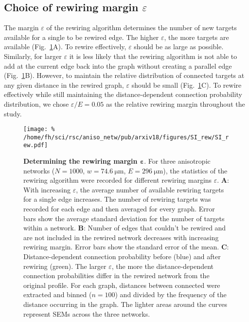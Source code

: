 
\subsection{Choice of rewiring margin $\varepsilon$}

The margin $\varepsilon$ of the rewiring algorithm determines the
number of new targets available for a single to be rewired edge. The
higher $\varepsilon$, the more targets are available
(Fig.~\ref{fig:rew-ddcp-ef}A). To rewire effectively, $\varepsilon$
should be as large as possible. Similarly, for larger $\varepsilon$ it
is less likely that the rewiring algorithm is not able to add at
the current edge back into the graph without creating a parallel edge
(Fig.~\ref{fig:rew-ddcp-ef}B). However, to maintain the relative
distribution of connected targets at any given distance in the rewired
graph, $\varepsilon$ should be small (Fig.~\ref{fig:rew-ddcp-ef}C). To
rewire effectively while still maintaining the distance-dependent
connection probability distribution, we chose $\varepsilon/E = 0.05$
as the relative rewiring margin throughout the study. 

\addtocounter{subsection}{1}
\begin{figure}[h!]
  \texttt{[image: \%
    /home/fh/sci/rsc/aniso\_netw/pub/arxiv18/figures/SI\_rew/SI\_rew.pdf]}
  \caption{\textbf{Determining the rewiring margin
      $\bm{\varepsilon}$}. For three anisotropic networks ($N=1000$,
    $w=\SI{74.6}{\micro\meter}$, $E=\SI{296}{\micro\meter}$), the
    statistics of the rewiring algorithm were recorded for different
    rewiring margins $\varepsilon$.
    \textbf{A}: With increasing $\varepsilon$, the average number of
    available rewiring targets for a single edge increases. The number
    of rewiring targets was recorded for each edge and then averaged
    for every graph. Error bars show the average standard deviation
    for the number of targets within a network.
    \textbf{B}: Number of edges that couldn't be rewired and are not
    included in the rewired network decreases with increasing rewiring
    margin. Error bars show the standard error of the
    mean.
    \textbf{C}: Distance-dependent connection probability before
    (blue) and after rewiring (green). The larger $\varepsilon$, the
    more the distance-dependent connection probabilities differ in the
    rewired network from the original profile. For each graph,
    distances between connected were extracted and binned ($n=100$)
    and divided by the frequency of the distance occurring in the
    graph. The lighter areas around the curves represent SEMs across
    the three networks.}
  \label{fig:rew-ddcp-ef}
  \end{figure}
